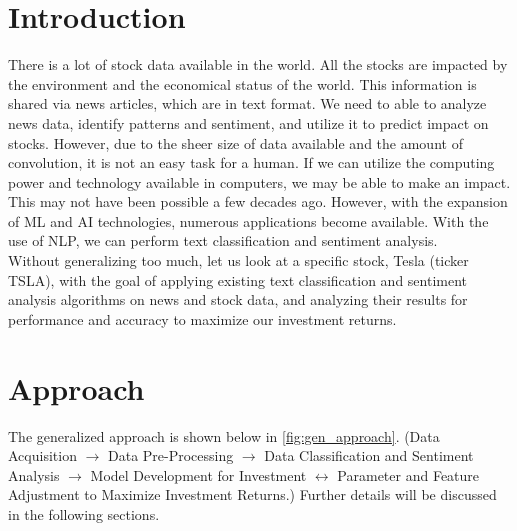 \documentclass[twocolumn,10pt]{article}
\begin{document}
\begin{multicols}{2}
\begin{flushleft}
	\section{Introduction} \label{introduction}
	There is a lot of stock data available in the world. All the stocks are impacted by the environment and the economical status of the world. This information is shared via news articles, which are in text format. We need to able to analyze news data, identify patterns and sentiment, and utilize it to predict impact on stocks. However, due to the sheer size of data available and the amount of convolution, it is not an easy task for a human. If we can
utilize the computing power and technology available in computers, we may be able to make an impact. This may not have been possible a few decades ago. However, with the expansion of ML and AI technologies, numerous applications become available. With the use of NLP, we can perform text classification and sentiment analysis.\\
	Without generalizing too much, let us look at a specific stock, Tesla (ticker TSLA), with the goal of applying existing text classification and sentiment analysis algorithms on news and stock data, and analyzing their results for performance and accuracy to maximize our investment returns. 
	
	\section{Approach} \label{approach}
	The generalized approach is shown below in \cref{fig:gen_approach}. (Data Acquisition $\rightarrow$ Data Pre-Processing $\rightarrow$ Data Classification and Sentiment Analysis $\rightarrow$ Model Development for Investment $\leftrightarrow$ Parameter and Feature Adjustment to Maximize Investment Returns.) Further details will be discussed in the following sections. 


\end{flushleft}
\end{multicols}
\end{document}
